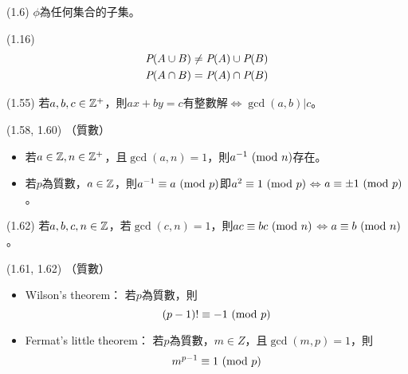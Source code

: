 \item \begin{theorem}{(1.6)} $\phi$為任何集合的子集。
\end{theorem}

\item \begin{theorem}{(1.16)} \begin{subequations}
    \begin{align}
        \P(A \cup B) & \neq \P(A) \cup \P(B) \\
        \P(A \cap B) & = \P(A) \cap \P(B)
    \end{align}
    \end{subequations}
\end{theorem}

\item \begin{theorem}{(1.55)} 若$a, b, c \in \N$，則$ax + by = c$有整數解$\iff$$\gcd(a, b) | c$。
\end{theorem}

\item \begin{theorem}{(1.58, 1.60)} （質數）
    \begin{itemize}
        \item 若$a \in \Z, n \in \N$，且$\gcd(a, n) = 1$，則$a^{-1} \Mod{n}$存在。
        \item 若$p$為質數，$a \in \Z$，則$a^{-1} \equiv a \Mod{p}$即$a^2 \equiv 1 \Mod{p}$$\iff$$a \equiv \pm 1 \Mod{p}$。
    \end{itemize}
\end{theorem}

\item \begin{theorem}{(1.62)} 若$a, b, c, n \in \Z$，若$\gcd(c, n) = 1$，則$ac \equiv bc \Mod{n}$$\iff$$a \equiv b \Mod{n}$。
\end{theorem}

\item \begin{theorem}{(1.61, 1.62)} （質數）
    \begin{itemize}
        \item Wilson's theorem：
        若$p$為質數，則
        \begin{equation}
            (p - 1)! \equiv -1 \Mod{p}
        \end{equation}
        \item Fermat's little theorem：
        若$p$為質數，$m \in Z$，且$\gcd(m, p) = 1$，則
        \begin{equation}
            m^{p - 1} \equiv 1 \Mod{p}
        \end{equation}
    \end{itemize}
\end{theorem}

